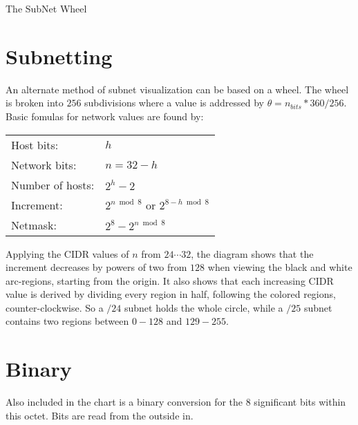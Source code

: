 \documentclass[10pt]{article}
\begin{document}
\thispagestyle{empty}
\begin{center}
  {\Large The SubNet Wheel}\\
\end{center}

\section{Subnetting}

An alternate method of subnet visualization can be based on a wheel. The wheel
is broken into $256$ subdivisions where a value is addressed by
$\theta=n_{bits}*360/256$. Basic fomulas for network values are found by:

\begin{tabular}{ll}
Host bits:   		& $h$\\
Network bits: 		& $n=32-h$\\
Number of hosts: 	& $2^h-2$\\
Increment: 		& $2^{n \bmod 8}$ or $2^{8-h \bmod 8}$\\
Netmask: 		& $2^8-2^{n \bmod 8}$\\
\end{tabular}

Applying the CIDR values of $n$ from $24\cdots32$, the diagram shows that the
increment decreases by powers of two from $128$ when viewing the black and white
arc-regions, starting from the origin. It also shows that each increasing CIDR
value is derived by dividing every region in half, following the colored regions,
counter-clockwise. So a $/24$ subnet holds the whole circle, while a $/25$
subnet contains two regions between $0-128$ and $129-255$.

\section{Binary}

Also included in the chart is a binary conversion for the 8 significant bits
within this octet. Bits are read from the outside in.

\end{document}
